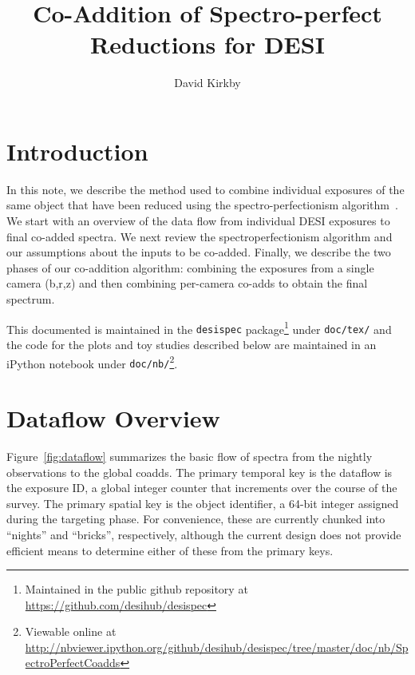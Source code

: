 \documentclass[12pt]{article}
\title{Co-Addition of Spectro-perfect\\
Reductions for DESI}
\author{David Kirkby}
\providecommand{\fig}[1]{Figure~\ref{fig:#1}}
\begin{document}
\maketitle

\section{Introduction}

In this note, we describe the method used to combine individual exposures of the same object that have been reduced using the spectro-perfectionism algorithm~\cite{2010PASP..122..248B}. We start with an overview of the data flow from individual DESI exposures to final co-added spectra. We next review the spectroperfectionism algorithm and our assumptions about the inputs to be co-added. Finally, we describe the two phases of our co-addition algorithm: combining the exposures from a single camera (b,r,z) and then combining per-camera co-adds to obtain the final spectrum.

This documented is maintained in the {\tt desispec} package\footnote{Maintained in the public github repository at \url{https://github.com/desihub/desispec}} under {\tt doc/tex/} and the code for the plots and toy studies described below are maintained in an iPython notebook under {\tt doc/nb/}\footnote{Viewable online at \url{http://nbviewer.ipython.org/github/desihub/desispec/tree/master/doc/nb/SpectroPerfectCoadds}}.

\section{Dataflow Overview}

\fig{dataflow} summarizes the basic flow of spectra from the nightly observations to the global coadds. The primary temporal key is the dataflow is the exposure ID, a global integer counter that increments over the course of the survey. The primary spatial key is the object identifier, a 64-bit integer assigned during the targeting phase. For convenience, these are currently chunked into ``nights'' and ``bricks'', respectively, although the current design does not provide efficient means to determine either of these from the primary keys.
\end{document}
